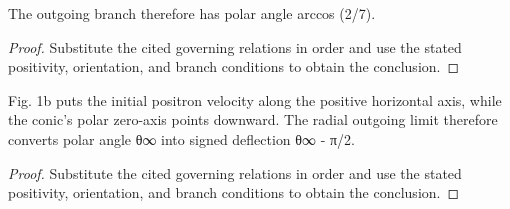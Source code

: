 \begin{lemma}
  \label{lem:physics:IPhO_2026_1_B_2:aux029}
  The outgoing branch therefore has polar angle arccos (2/7).
\end{lemma}
\begin{proof}
  Substitute the cited governing relations in order and use the stated positivity, orientation, and branch conditions to obtain the conclusion.
\end{proof}

\begin{lemma}
  \label{lem:physics:IPhO_2026_1_B_2:aux030}
  Fig. 1b puts the initial positron velocity along the positive horizontal axis, while the conic's polar zero-axis points downward. The radial outgoing limit therefore converts polar angle θ∞ into signed deflection θ∞ - π/2.
\end{lemma}
\begin{proof}
  Substitute the cited governing relations in order and use the stated positivity, orientation, and branch conditions to obtain the conclusion.
\end{proof}

